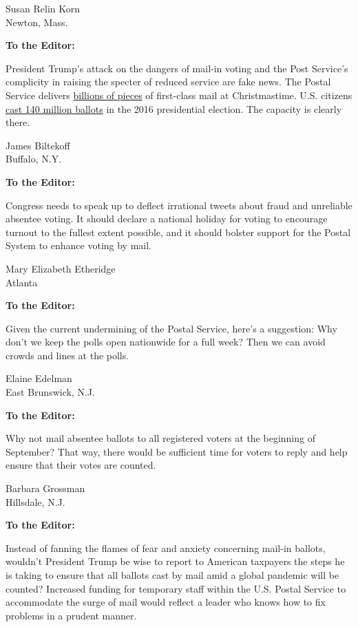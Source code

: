 Susan Relin Korn\\
Newton, Mass.

\textbf{To the Editor:}

President Trump's attack on the dangers of mail-in voting and the Post
Service's complicity in raising the specter of reduced service are fake
news. The Postal Service delivers
\href{https://about.usps.com/newsroom/national-releases/2019/1107-20-million-packages-to-be-delivered-daily-this-holiday-season.htm}{billions
of pieces} of first-class mail at Christmastime. U.S. citizens
\href{https://www.eac.gov/news/2017/06/29/newly-released-2016-election-administration-and-voting-survey-provides-snapshot}{cast
140 million ballots} in the 2016 presidential election. The capacity is
clearly there.

James Biltekoff\\
Buffalo, N.Y.

\textbf{To the Editor:}

Congress needs to speak up to deflect irrational tweets about fraud and
unreliable absentee voting. It should declare a national holiday for
voting to encourage turnout to the fullest extent possible, and it
should bolster support for the Postal System to enhance voting by mail.

Mary Elizabeth Etheridge\\
Atlanta

\textbf{To the Editor:}

Given the current undermining of the Postal Service, here's a
suggestion: Why don't we keep the polls open nationwide for a full week?
Then we can avoid crowds and lines at the polls.

Elaine Edelman\\
East Brunswick, N.J.

\textbf{To the Editor:}

Why not mail absentee ballots to all registered voters at the beginning
of September? That way, there would be sufficient time for voters to
reply and help ensure that their votes are counted.

Barbara Grossman\\
Hillsdale, N.J.

\textbf{To the Editor:}

Instead of fanning the flames of fear and anxiety concerning mail-in
ballots, wouldn't President Trump be wise to report to American
taxpayers the steps he is taking to ensure that all ballots cast by mail
amid a global pandemic will be counted? Increased funding for temporary
staff within the U.S. Postal Service to accommodate the surge of mail
would reflect a leader who knows how to fix problems in a prudent
manner.

